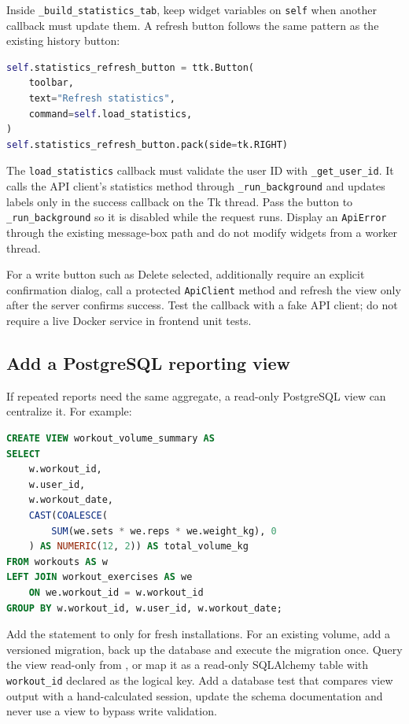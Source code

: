 \documentclass[11pt,a4paper]{article}
\newcommand{\filepath}[1]{\path{#1}}
\begin{document}
Inside \texttt{\_build\_statistics\_tab}, keep widget variables on
\texttt{self} when another callback must update them. A refresh button follows
the same pattern as the existing history button:

\begin{lstlisting}[language=Python,caption={Button and callback pattern}]
self.statistics_refresh_button = ttk.Button(
    toolbar,
    text="Refresh statistics",
    command=self.load_statistics,
)
self.statistics_refresh_button.pack(side=tk.RIGHT)
\end{lstlisting}

The \texttt{load\_statistics} callback must validate the user ID with
\texttt{\_get\_user\_id}. It calls the API client's statistics method through
\texttt{\_run\_background} and updates labels only in the success callback on
the Tk thread. Pass the button to \texttt{\_run\_background} so it is disabled
while the request runs. Display an \texttt{ApiError} through the existing
message-box path and do not modify widgets from a worker thread.

For a write button such as Delete selected, additionally require an explicit
confirmation dialog, call a protected \texttt{ApiClient} method and refresh the
view only after the server confirms success. Test the callback with a fake API
client; do not require a live Docker service in frontend unit tests.

\subsection{Add a PostgreSQL reporting view}

If repeated reports need the same aggregate, a read-only PostgreSQL view can
centralize it. For example:

\begin{lstlisting}[language=SQL,caption={Example reporting view}]
CREATE VIEW workout_volume_summary AS
SELECT
    w.workout_id,
    w.user_id,
    w.workout_date,
    CAST(COALESCE(
        SUM(we.sets * we.reps * we.weight_kg), 0
    ) AS NUMERIC(12, 2)) AS total_volume_kg
FROM workouts AS w
LEFT JOIN workout_exercises AS we
    ON we.workout_id = w.workout_id
GROUP BY w.workout_id, w.user_id, w.workout_date;
\end{lstlisting}

Add the statement to \filepath{init.sql} only for fresh installations. For an
existing volume, add a versioned migration, back up the database and execute
the migration once. Query the view read-only from \filepath{main.py}, or map it
as a read-only SQLAlchemy table with \texttt{workout\_id} declared as the
logical key. Add a database test that compares view output with a hand-calculated
session, update the schema documentation and never use a view to bypass write
validation.
\end{document}
